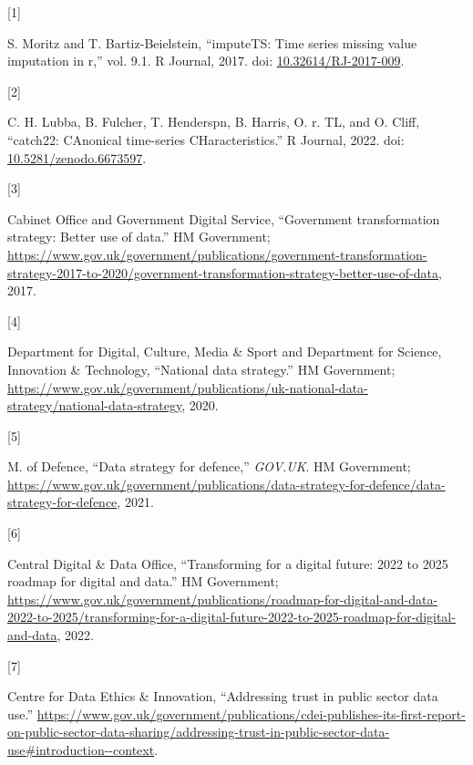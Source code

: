 \documentclass{article}
\newlength{\cslhangindent}
\newlength{\csllabelwidth}
\newlength{\cslentryspacingunit} %
\newenvironment{CSLReferences}[2] %
 {%
  \setlength{\parindent}{0pt}
  \ifodd #1
  \let\oldpar\par
  \def\par{\hangindent=\cslhangindent\oldpar}
  \fi
  \setlength{\parskip}{#2\cslentryspacingunit}
 }%
 {}
\newcommand{\CSLLeftMargin}[1]{\parbox[t]{\csllabelwidth}{#1}}
\newcommand{\CSLRightInline}[1]{\parbox[t]{\linewidth - \csllabelwidth}{#1}\break}
\begin{document}
\hypertarget{refs}{}
\begin{CSLReferences}{0}{0}
\leavevmode{}%
\CSLLeftMargin{{[}1{]} }%
\CSLRightInline{S. Moritz and T. Bartiz-Beielstein, {``imputeTS: Time
series missing value imputation in r,''} vol. 9.1. R Journal, 2017. doi:
\href{https://doi.org/10.32614/RJ-2017-009}{10.32614/RJ-2017-009}.}

\leavevmode{}%
\CSLLeftMargin{{[}2{]} }%
\CSLRightInline{C. H. Lubba, B. Fulcher, T. Henderspn, B. Harris, O. r.
TL, and O. Cliff, {``catch22: CAnonical time-series CHaracteristics.''}
R Journal, 2022. doi:
\href{https://doi.org/10.5281/zenodo.6673597}{10.5281/zenodo.6673597}.}

\leavevmode{}%
\CSLLeftMargin{{[}3{]} }%
\CSLRightInline{Cabinet Office and Government Digital Service,
{``Government transformation strategy: Better use of data.''} HM
Government;
\url{https://www.gov.uk/government/publications/government-transformation-strategy-2017-to-2020/government-transformation-strategy-better-use-of-data},
2017.}

\leavevmode{}%
\CSLLeftMargin{{[}4{]} }%
\CSLRightInline{Department for Digital, Culture, Media \& Sport and
Department for Science, Innovation \& Technology, {``National data
strategy.''} HM Government;
\url{https://www.gov.uk/government/publications/uk-national-data-strategy/national-data-strategy},
2020.}

\leavevmode{}%
\CSLLeftMargin{{[}5{]} }%
\CSLRightInline{M. of Defence, {``Data strategy for defence,''}
\emph{GOV.UK}. HM Government;
\url{https://www.gov.uk/government/publications/data-strategy-for-defence/data-strategy-for-defence},
2021.}

\leavevmode{}%
\CSLLeftMargin{{[}6{]} }%
\CSLRightInline{Central Digital \& Data Office, {``Transforming for a
digital future: 2022 to 2025 roadmap for digital and data.''} HM
Government;
\url{https://www.gov.uk/government/publications/roadmap-for-digital-and-data-2022-to-2025/transforming-for-a-digital-future-2022-to-2025-roadmap-for-digital-and-data},
2022.}

\leavevmode{}%
\CSLLeftMargin{{[}7{]} }%
\CSLRightInline{Centre for Data Ethics \& Innovation, {``Addressing
trust in public sector data use.''}
\url{https://www.gov.uk/government/publications/cdei-publishes-its-first-report-on-public-sector-data-sharing/addressing-trust-in-public-sector-data-use\#introduction--context}.}


\end{CSLReferences}
\end{document}
